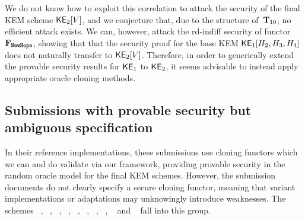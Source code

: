 We do not know how to exploit this correlation to attack the \INDCCA security of the final KEM scheme ${\mathsf{KE}}_2[V]$, and we conjecture that, due to the structure of~$\mathbf{T}_{10}$, no efficient attack exists. 
We can, however, attack the rd-indiff security of functor $\construct{F}_{\pqcnameRoundTwo{NewHope}}$, showing that that the security proof for the base KEM ${\mathsf{KE}}_1[H_2,H_3,H_4]$ does not naturally transfer to ${\mathsf{KE}}_2[V]$.
Therefore, in order to generically extend the provable security results for ${\mathsf{KE}}_1$ to ${\mathsf{KE}}_2$, it seems advisable to instead apply appropriate oracle cloning methods.

\subsection{Submissions with provable security but ambiguous specification}

In their reference implementations, these submissions use cloning functors which we can and do validate via our framework, providing provable security in the random oracle model for the final KEM schemes. However, the submission documents do not clearly specify a secure cloning functor, meaning that variant implementations or adaptations may unknowingly introduce weaknesses. 
The schemes
~\cite{nistpqc:BIKE},
~\cite{nistpqc:KCL},
~\cite{nistpqc:LAC},
~\cite{nistpqc:Lizard},
~\cite{nistpqc:LOCKER},
~\cite{nistpqc:OddM},
~\cite{nistpqc:ROLLO},
~\cite{nistpqc:Round5},
~\cite{nistpqc:SABER} and
~\cite{nistpqc:Titanium}
fall into this group.



